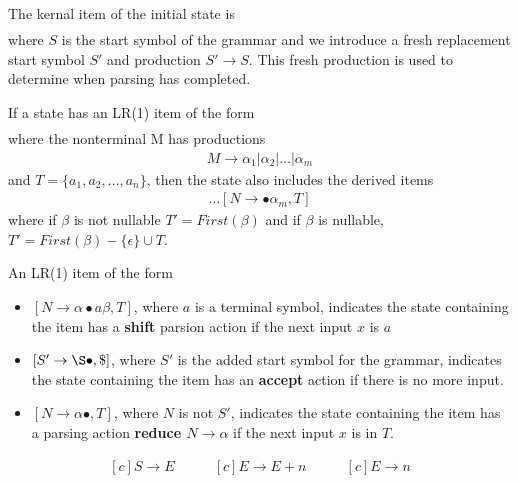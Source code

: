 The kernal item of the initial state is
\begin{align*}
    [S' \rightarrow \bullet S, \$]
\end{align*}
where $S$ is the start symbol of the grammar and we introduce a fresh replacement start 
symbol $S'$ and production $S' \rightarrow S$. This fresh production is used to determine 
when parsing has completed.

If a state has an LR(1) item of the form
\begin{align*}
    [N \rightarrow \alpha \bullet M \beta, T]
\end{align*}
where the nonterminal M has productions
\begin{align*}
    M \rightarrow \alpha_1 | \alpha_2 | \dots | \alpha_m
\end{align*}
and $T = \{a_1, a_2, \dots, a_n\}$, then the state also includes the derived items
\begin{align*}
    [N \rightarrow \bullet \alpha_1, T]
    \dots
    [N \rightarrow \bullet \alpha_m, T]
\end{align*}
where if $\beta$ is not nullable $T' = First(\beta)$ and if $\beta$ is nullable, 
$T' = First(\beta) - \{\epsilon\} \cup T$.

An LR(1) item of the form
\begin{itemize}
    \item $[N \rightarrow \alpha \bullet a \beta, T]$, where $a$ is a terminal symbol, 
    indicates the state containing the item has a \textbf{shift} parsion action if the
    next input $x$ is $a$
    \item $[S' \rightarrow \S \bullet, \$]$, where $S'$ is the added start symbol for 
    the grammar, indicates the state containing the item has an \textbf{accept} action 
    if there is no more input.
    \item $[N \rightarrow \alpha \bullet, T]$, where $N$ is not $S'$, indicates the state 
    containing the item has a parsing action \textbf{reduce $N \rightarrow \alpha$} if 
    the next input $x$ is in $T$.
\end{itemize}

\begin{equation*}
    \begin{aligned}[c]
        S \rightarrow E
    \end{aligned}
    \qquad 
    \begin{aligned}[c]
        E \rightarrow E + n
    \end{aligned}
    \qquad 
    \begin{aligned}[c]
        E \rightarrow n
    \end{aligned}
\end{equation*}

